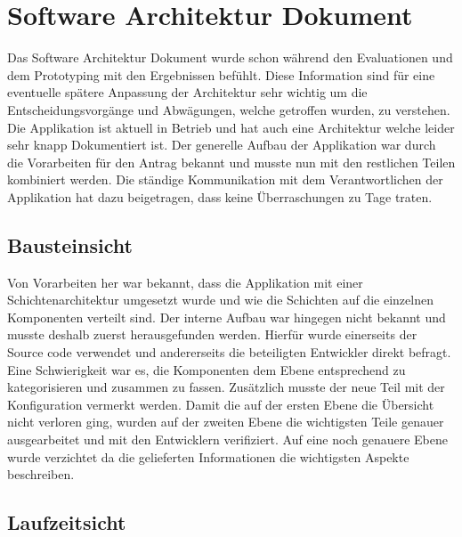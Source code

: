 \section{Software Architektur Dokument}

Das Software Architektur Dokument wurde schon während den Evaluationen und dem Prototyping mit den Ergebnissen befühlt. Diese Information sind für eine eventuelle spätere Anpassung der Architektur sehr wichtig um die Entscheidungsvorgänge und Abwägungen, welche getroffen wurden, zu verstehen. Die Applikation ist aktuell in Betrieb und hat auch eine Architektur welche leider sehr knapp Dokumentiert ist. Der generelle Aufbau der Applikation war durch die Vorarbeiten für den Antrag bekannt und musste nun mit den restlichen Teilen kombiniert werden. Die ständige Kommunikation mit dem Verantwortlichen der Applikation hat dazu beigetragen, dass keine Überraschungen zu Tage traten.

\subsection{Bausteinsicht}

Von Vorarbeiten her war bekannt, dass die Applikation mit einer Schichtenarchitektur umgesetzt wurde und wie die Schichten auf die einzelnen Komponenten verteilt sind. Der interne Aufbau war hingegen nicht bekannt und musste deshalb zuerst herausgefunden werden. Hierfür wurde einerseits der Source code verwendet und andererseits die beteiligten Entwickler direkt befragt. Eine Schwierigkeit war es, die Komponenten dem Ebene entsprechend zu kategorisieren und zusammen zu fassen. Zusätzlich musste der neue Teil mit der Konfiguration vermerkt werden. Damit die auf der ersten Ebene die Übersicht nicht verloren ging, wurden auf der zweiten Ebene die wichtigsten Teile genauer ausgearbeitet und mit den Entwicklern verifiziert. Auf eine noch genauere Ebene wurde verzichtet da die gelieferten Informationen die wichtigsten Aspekte beschreiben.

\subsection{Laufzeitsicht}

